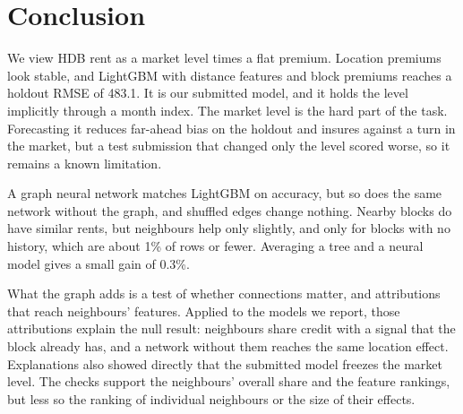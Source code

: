 \section{Conclusion}

We view HDB rent as a market level times a flat premium. Location premiums look stable, and LightGBM with distance features and block premiums reaches a holdout RMSE of 483.1. It is our submitted model, and it holds the level implicitly through a month index. The market level is the hard part of the task. Forecasting it reduces far-ahead bias on the holdout and insures against a turn in the market, but a test submission that changed only the level scored worse, so it remains a known limitation.

A graph neural network matches LightGBM on accuracy, but so does the same network without the graph, and shuffled edges change nothing. Nearby blocks do have similar rents, but neighbours help only slightly, and only for blocks with no history, which are about 1\% of rows or fewer. Averaging a tree and a neural model gives a small gain of 0.3\%.

What the graph adds is a test of whether connections matter, and attributions that reach neighbours' features. Applied to the models we report, those attributions explain the null result: neighbours share credit with a signal that the block already has, and a network without them reaches the same location effect. Explanations also showed directly that the submitted model freezes the market level. The checks support the neighbours' overall share and the feature rankings, but less so the ranking of individual neighbours or the size of their effects.
